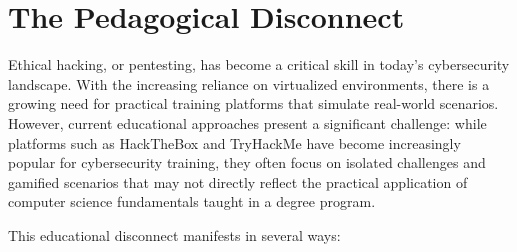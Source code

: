 \section{The Pedagogical Disconnect}

Ethical hacking, or pentesting, has become a critical skill in today's cybersecurity 
landscape. With the increasing reliance on virtualized environments, there is a growing 
need for practical training platforms that simulate real-world scenarios. However, current 
educational approaches present a significant challenge: while platforms such as HackTheBox\cite{hackthebox} 
and TryHackMe\cite{tryhackme} have become increasingly popular for cybersecurity training, they often focus 
on isolated challenges and gamified scenarios that may not directly reflect the practical 
application of computer science fundamentals taught in a degree program.

This educational disconnect manifests in several ways:

